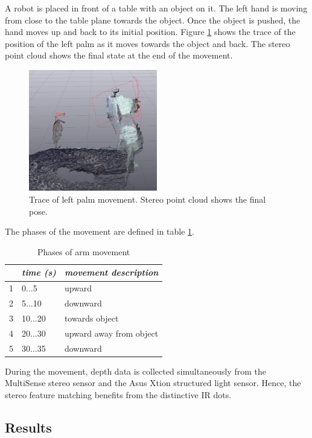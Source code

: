 A robot is placed in front of a table with an object on it. The left hand is moving from close to the table plane towards the object. Once the object is pushed, the hand moves up and back to its initial position. Figure \ref{fig:bottle_move_trace} shows the trace of the position of the left palm as it moves towards the object and back. The stereo point cloud shows the final state at the end of the movement.
%
\begin{figure}
\centering
\includegraphics[width=0.5\textwidth]{images/eval_prior/bottle_movement_trace.png}
\caption{Trace of left palm movement. Stereo point cloud shows the final pose.}
\label{fig:bottle_move_trace}
\end{figure}
%
The phases of the movement are defined in table \ref{tab:movement_phases}.

\begin{table}
\centering
\begin{tabular}{|c|l|l|}
\hline
 & \emph{time (s)} & \emph{movement description} \\
\hline
1 & 0$\dots$5 & upward \\
\hline
2 & 5$\dots$10 & downward \\
\hline
3 & 10$\dots$20 & towards object \\
\hline
4 & 20$\dots$30 & upward away from object \\
\hline
5 & 30$\dots$35 & downward \\
\hline
\end{tabular}
\caption{Phases of arm movement}
\label{tab:movement_phases}
\end{table}

During the movement, depth data is collected simultaneously from the MultiSense stereo sensor and the Asus Xtion structured light sensor. Hence, the stereo feature matching benefits from the distinctive IR dots.

\subsection{Results}

